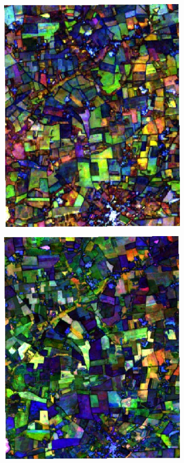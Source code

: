 \documentclass[journal,article,submit,pdftex,moreauthors]{Definitions/mdpi}
\begin{document}
\begin{figure}[H]
\begin{subfigure}[t]{0.23\linewidth}
    \caption{}
	\label{fig:color_map_f}
	\end{subfigure}
    \begin{subfigure}[t]{0.23\linewidth}
		\centering
	\includegraphics[height=\linewidth,width=0.95\linewidth]{figures/aes_1_layer_mse_results/composites/composite_image_514283.pdf}
    \caption{}
	\label{fig:color_map_g}
	\end{subfigure}
    \begin{subfigure}[t]{0.23\linewidth}
		\centering
	\includegraphics[height=\linewidth,width=0.95\linewidth]{figures/aes_1_layer_mse_results/composites/composite_image_2479133.pdf}

\end{subfigure}
\end{figure}
\end{document}
